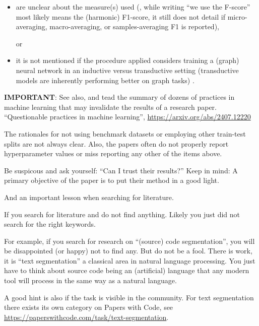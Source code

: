 \documentclass[sigconf, nonacm]{acmart}
\begin{document}
\begin{tcolorbox}[title=Instructions]
\begin{itemize}
\item are unclear about the measure(s) used (\eg, while writing ``we use the F-score'' most likely means the (harmonic) F1-score, it still does not detail if micro-averaging, macro-averaging, or samples-averaging F1 is reported),
%

or

\item it is not mentioned if the procedure applied considers training a (graph) neural network in an inductive versus transductive setting (transductive models are inherently performing better on graph tasks)
%
.


\end{itemize}

\textbf{IMPORTANT}: See also, and tead the summary of dozens of practices in machine learning that may invalidate the results of a research paper.
%
``Questionable practices in machine learning'', \url{https://arxiv.org/abs/2407.12220}

\end{tcolorbox}

The rationales for not using benchmark datasets or employing other train-test splits are not always clear.
Also, the papers often do not properly report hyperparameter values or miss reporting any other of the items above.

\begin{tcolorbox}[title=As a general rule when reading related work]

Be suspicous and ask yourself: ``Can I trust their results?''
Keep in mind: A primary objective of the paper is to put their method in a good light.
\end{tcolorbox}

And an important lesson when searching for literature.

\begin{tcolorbox}[title=Lesson learned (once) again!]
If you search for literature and do not find anything. Likely you just did not search for the right keywords.

For example, if you search for research on ``(source) code segmentation'', you will be disappointed (or happy) not to find any.
But do not be a fool. 
There is work, it is ``text segmentation'' a classical area in natural language processing.
You just have to think about source code being an (artificial) language that any modern tool will process in the same way as a natural language.

A good hint is also if the task is visible in the community.
For text segmentation there exists its own category on Papers with Code, see \url{https://paperswithcode.com/task/text-segmentation}.
\end{tcolorbox}
\end{document}
